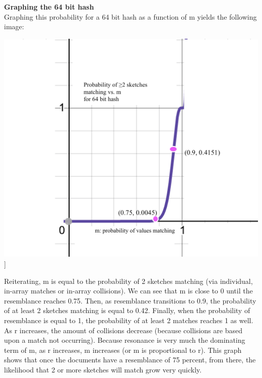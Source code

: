 \documentclass[11pt, solution, letterpaper]{format}
\begin{document}
\textbf{Graphing the 64 bit hash}\\
Graphing this probability for a 64 bit hash as a function of m yields the following image:\\
\begin{center}\includegraphics[scale=.5]{64bit.png}]\end{center}

Reiterating, m is equal to the probability of 2 sketches matching (via individual, in-array matches or in-array collisions). 
We can see that m is close to 0 until the resemblance reaches 0.75. Then, as resemblance transitions to 0.9, the probability of at least 2 sketches matching is equal to 0.42. Finally, when the probability of resemblance is equal to 1, the probability of at least 2 matches reaches 1 as well. As r increases, the amount of collisions decrease (because collisions are based upon a match not occurring). Because resonance is very much the dominating term of m, as  r increases, m increases (or m is proportional to r). This graph shows that once the documents have a resemblance of 75 percent, from there, the likelihood that 2 or more sketches will match grow very quickly. \\
\end{document}
